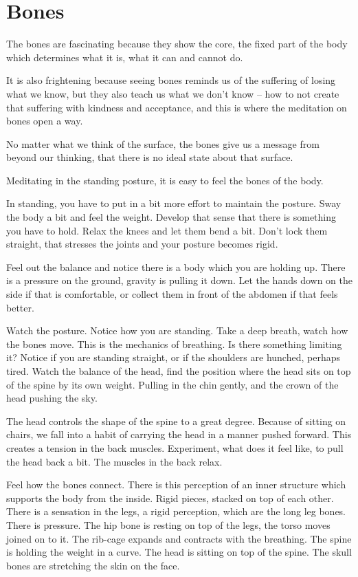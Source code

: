 \hypertarget{bones-1}{%
\chapter{Bones}\label{bones-1}}

The bones are fascinating because they show the core, the fixed part of
the body which determines what it is, what it can and cannot do.

It is also frightening because seeing bones reminds us of the suffering
of losing what we know, but they also teach us what we don't know -- how
to not create that suffering with kindness and acceptance, and this is
where the meditation on bones open a way.

No matter what we think of the surface, the bones give us a message from
beyond our thinking, that there is no ideal state about that surface.

Meditating in the standing posture, it is easy to feel the bones of the
body.

In standing, you have to put in a bit more effort to maintain the
posture. Sway the body a bit and feel the weight. Develop that sense
that there is something you have to hold. Relax the knees and let them
bend a bit. Don't lock them straight, that stresses the joints and your
posture becomes rigid.

Feel out the balance and notice there is a body which you are holding
up. There is a pressure on the ground, gravity is pulling it down. Let
the hands down on the side if that is comfortable, or collect them in
front of the abdomen if that feels better.

Watch the posture. Notice how you are standing. Take a deep breath,
watch how the bones move. This is the mechanics of breathing. Is there
something limiting it? Notice if you are standing straight, or if the
shoulders are hunched, perhaps tired. Watch the balance of the head,
find the position where the head sits on top of the spine by its own
weight. Pulling in the chin gently, and the crown of the head pushing
the sky.

The head controls the shape of the spine to a great degree. Because of
sitting on chairs, we fall into a habit of carrying the head in a manner
pushed forward. This creates a tension in the back muscles. Experiment,
what does it feel like, to pull the head back a bit. The muscles in the
back relax.

Feel how the bones connect. There is this perception of an inner
structure which supports the body from the inside. Rigid pieces, stacked
on top of each other. There is a sensation in the legs, a rigid
perception, which are the long leg bones. There is pressure. The hip
bone is resting on top of the legs, the torso moves joined on to it. The
rib-cage expands and contracts with the breathing. The spine is holding
the weight in a curve. The head is sitting on top of the spine. The
skull bones are stretching the skin on the face.

